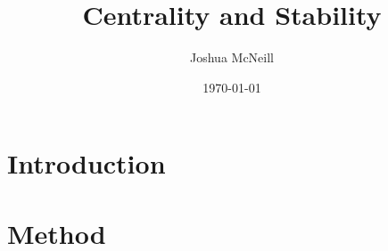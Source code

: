 \documentclass{article}
\title{Centrality and Stability}
\author{Joshua McNeill}
\date{\today}
\begin{document}
  \maketitle
  \section{Introduction}
  \section{Method}
\end{document}
